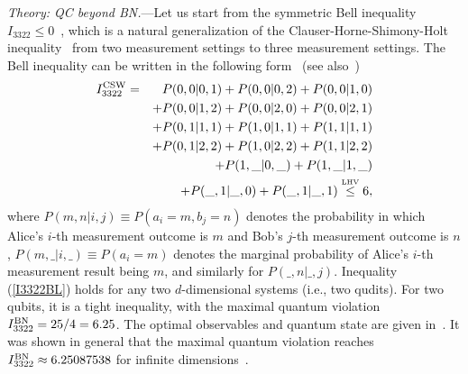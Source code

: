 \documentclass[prl,letterpaper,english,reprint,nofootinbib,aps,superscriptaddress,showpacs,showkeys]{revtex4-1}
\theoremstyle{definition}
\theoremstyle{remark}
\begin{document}

\emph{Theory: QC beyond BN.}---Let us start from the symmetric Bell inequality  $I_{3322}\le 0$~\cite{BG08}, which is a natural generalization of the Clauser-Horne-Shimony-Holt inequality~\cite{CHSH} from two measurement settings to three measurement settings.
The Bell inequality can be written in the following form~\cite{RDLTC14} (see also~\cite{SM})
 \begin{eqnarray}
 I_{3322}^{\rm CSW}
 &=&P(0,0 \vert 0,1) + P(0,0 \vert 0,2) + P(0,0 \vert 1,0) \nonumber\\
 &&+ P(0,0 \vert 1,2) + P(0,0 \vert 2,0) + P(0,0 \vert 2,1) \nonumber \\
 &&+ P(0,1 \vert 1,1) + P(1,0 \vert 1,1) + P(1,1 \vert 1,1) \nonumber\\
 &&+ P(0,1 \vert 2,2) + P(1,0 \vert 2,2) + P(1,1 \vert 2,2) \nonumber \\
 &&+ P(1,\_ \vert 0,\_) +P(1,\_ \vert 1,\_)\nonumber \\
 &&  + P(\_,1 \vert \_,0)+ P(\_,1 \vert \_,1)\stackrel{\mbox{\tiny{LHV}}}{\leq}6,
\label{I3322BL}
\end{eqnarray}
where $P(m,n|i,j)\equiv P(a_i=m, b_j=n)$ denotes the probability in which Alice's $i$-th measurement outcome is $m$ and Bob's $j$-th measurement outcome is $n$, $P(m,\_|i,\_)\equiv P(a_i=m)$ denotes the marginal probability of Alice's $i$-th measurement result being $m$, and similarly for $P(\_,n|\_,j)$. Inequality (\ref{I3322BL}) holds for any two $d$-dimensional systems (i.e., two qudits). For two qubits, it is a tight inequality, with the maximal quantum violation $I_{3322}^{\rm BN}=25/4=6.25$. The optimal observables and quantum state are given in~\cite{SM}. It was shown in general that the maximal quantum violation reaches $I_{3322}^{\rm BN}\approx6.25087538$ for infinite dimensions~\cite{Pal10}.
\end{document}
